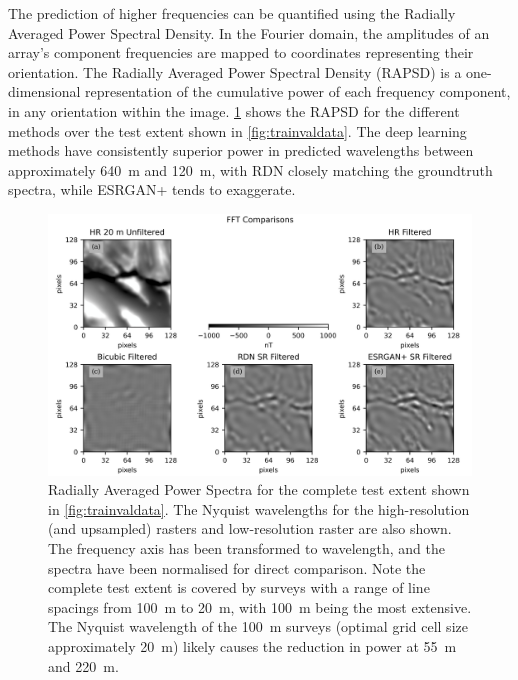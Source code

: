 \documentclass[manuscript.tex]{subfiles}
\begin{document}
The prediction of higher frequencies can be quantified using the Radially Averaged Power Spectral Density.
In the Fourier domain, the amplitudes of an array's component frequencies are mapped to coordinates representing their orientation.
The Radially Averaged Power Spectral Density (RAPSD) \parencite{ulichneyDitheringBlueNoise1988} is a one-dimensional representation of the cumulative power of each frequency component, in any orientation within the image.
\cref{fig:rapsd} shows the RAPSD for the different methods over the test extent shown in \cref{fig:trainvaldata}. The deep learning methods have consistently superior power in predicted wavelengths between approximately \SI{640}{\metre} and \SI{120}{\metre}, with RDN\textdaggerdbl{} closely matching the groundtruth spectra, while ESRGAN+ tends to exaggerate.


\begin{figure}[hbt]
    \includegraphics[width=\linewidth]{fig/p1/image8.png}
    \caption[short]{Radially Averaged Power Spectra for the complete test extent shown in \cref{fig:trainvaldata}.
        The Nyquist wavelengths for the high-resolution (and upsampled) rasters and low-resolution raster are also shown.
        The frequency axis has been transformed to wavelength, and the spectra have been normalised for direct comparison.
        Note the complete test extent is covered by surveys with a range of line spacings from \SI{100}{\metre} to \SI{20}{\metre}, with \SI{100}{\metre} being the most extensive.
        The Nyquist wavelength of the \SI{100}{\metre} surveys (optimal grid cell size approximately \SI{20}{\metre}) likely causes the reduction in power at \SI{55}{\metre} and \SI{220}{\metre}.
    }
    \label{fig:rapsd}
\end{figure}
\end{document}
